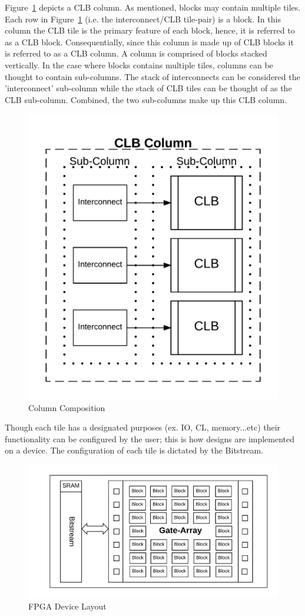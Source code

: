 Figure~\ref{fig:column} depicts a \acrfull{CLB} column.
As mentioned, blocks may contain multiple tiles.
Each row in Figure~\ref{fig:column} (i.e. the interconnect/\acrshort{CLB} tile-pair) is a block. 
In this column the \acrshort{CLB} tile is the primary feature of each block, hence, it is referred to as a \acrshort{CLB} block.
Consequentially, since this column is made up of \acrshort{CLB} blocks it is referred to as a \acrshort{CLB} column.
A column is comprised of blocks stacked vertically.
In the case where blocks contains multiple tiles, columns can be thought to contain sub-columns.
The stack of interconnects can be considered the 'interconnect' sub-column while the stack of \acrshort{CLB} tiles can be thought of as the \acrshort{CLB} sub-column.
Combined, the two sub-columns make up this \acrshort{CLB} column. 
\begin{figure}
\centering
\includegraphics[width=0.7\linewidth]{Figures/column}
\caption[Column Composition]{Column Composition}
\label{fig:column}
\end{figure}
Though each tile has a designated purposes (ex. \acrfull{IO}, \acrfull{CL}, memory...etc) their functionality can be configured by the user; this is how designs are implemented on a device.
The configuration of each tile is dictated by the \gls{Bitstream}. 
\begin{figure}[h]
	\centering
	\includegraphics[width=0.9\linewidth]{Figures/architecture}
	\caption[FPGA Device Layout]{FPGA Device Layout}
	\label{fig:architecture}
\end{figure}

